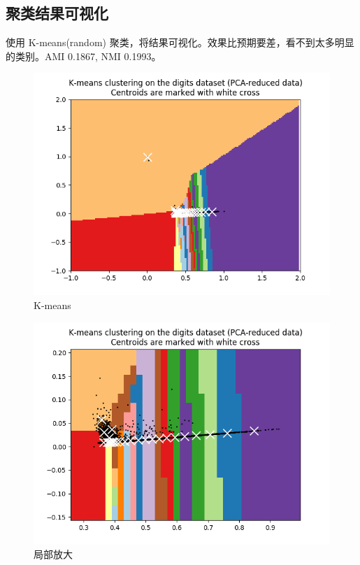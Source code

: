 \documentclass[12pt]{article}
\begin{document}
\subsection{聚类结果可视化}
使用 K-means(random) 聚类，将结果可视化。效果比预期要差，看不到太多明显的类别。AMI 0.1867, 
NMI 0.1993。\\
\begin{figure}[htbp]
\centering
\includegraphics[width=1.0\textwidth]{../kmeans.png}
\caption{K-means}
\label{fig:K-means}
\end{figure}

\begin{figure}[htbp]
\centering
\includegraphics[width=1.0\textwidth]{../kmeans_2.png}
\caption{局部放大}
\label{fig:K-means_2}
\end{figure}
\end{document}

